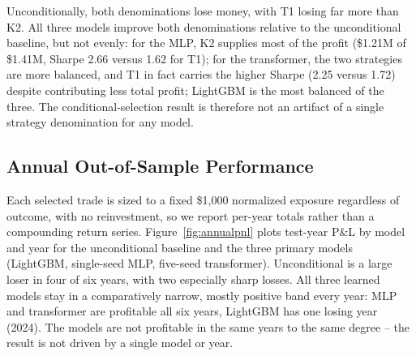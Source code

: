 \documentclass[sigconf,review,anonymous]{acmart}
\begin{document}
\begin{table}[t]
\centering
\footnotesize
{}
\caption{Table~\ref{tab:consolidated}'s primary result per model (single seed for LightGBM/MLP, five-seed ensemble for the transformer), split by T1/K2 so the source of improvement can be checked rather than assumed. Same \$1{,}000-per-trade convention and $p\ge0.5$ rule as Table~\ref{tab:consolidated}; `Combined' reproduces that row's Total P\&L.}
\label{tab:t1k2}
\end{table}

Unconditionally, both denominations lose money, with T1 losing far more than K2. All three models improve both denominations relative to the unconditional baseline, but not evenly: for the MLP, K2 supplies most of the profit (\$1.21M of \$1.41M, Sharpe 2.66 versus 1.62 for T1); for the transformer, the two strategies are more balanced, and T1 in fact carries the higher Sharpe (2.25 versus 1.72) despite contributing less total profit; LightGBM is the most balanced of the three. The conditional-selection result is therefore not an artifact of a single strategy denomination for any model.

\subsection{Annual Out-of-Sample Performance}
Each selected trade is sized to a fixed \$1{,}000 normalized exposure regardless of outcome, with no reinvestment, so we report per-year totals rather than a compounding return series. Figure~\ref{fig:annualpnl} plots test-year P\&L by model and year for the unconditional baseline and the three primary models (LightGBM, single-seed MLP, five-seed transformer). Unconditional is a large loser in four of six years, with two especially sharp losses. All three learned models stay in a comparatively narrow, mostly positive band every year: MLP and transformer are profitable all six years, LightGBM has one losing year (2024). The models are not profitable in the same years to the same degree -- the result is not driven by a single model or year.
\end{document}
